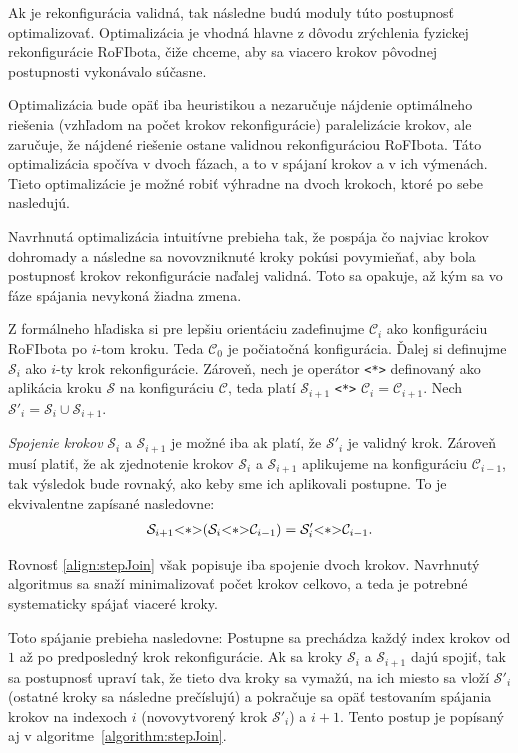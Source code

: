 \documentclass[
  printed, %
  oneside, %
  notable,   %
  nolof,     %
  nolot,     %
]{fithesis3}
\begin{document}
Ak je rekonfigurácia validná, tak následne budú moduly túto postupnosť optimalizovať. Optimalizácia je vhodná hlavne z dôvodu zrýchlenia fyzickej rekonfigurácie RoFIbota, čiže chceme, aby sa viacero krokov pôvodnej postupnosti vykonávalo súčasne. 

Optimalizácia bude opäť iba heuristikou a nezaručuje nájdenie optimálneho riešenia (vzhľadom na počet krokov rekonfigurácie) paralelizácie krokov, ale zaručuje, že nájdené riešenie ostane validnou rekonfiguráciou RoFIbota. Táto optimalizácia spočíva v dvoch fázach, a to v spájaní krokov a v ich výmenách. Tieto optimalizácie je možné robiť výhradne na dvoch krokoch, ktoré po sebe nasledujú. 

Navrhnutá optimalizácia intuitívne prebieha tak, že pospája čo najviac krokov dohromady a následne sa novovzniknuté kroky pokúsi povymieňať, aby bola postupnosť krokov rekonfigurácie naďalej validná. Toto sa opakuje, až kým sa vo fáze spájania nevykoná žiadna zmena. 

Z formálneho hľadiska si pre lepšiu orientáciu zadefinujme $\mathcal{C}_i$ ako konfiguráciu RoFIbota po $i$-tom kroku. Teda $\mathcal{C}_0$ je počiatočná konfigurácia. Ďalej si definujme $\mathcal{S}_i$ ako $i$-ty krok rekonfigurácie. Zároveň, nech je operátor \lstinline{<*>} definovaný ako aplikácia kroku $\mathcal{S}$ na konfiguráciu $\mathcal{C}$, teda platí $\mathcal{S}_{i + 1}$ \lstinline{<*>} $\mathcal{C}_i = \mathcal{C}_{i + 1}$. Nech $\mathcal{S}'_i = \mathcal{S}_i \cup \mathcal{S}_{i + 1}$. 

\textit{Spojenie krokov} $\mathcal{S}_i$ a $\mathcal{S}_{i + 1}$ je možné iba ak platí, že $\mathcal{S}'_i$ je validný krok. Zároveň musí platiť, že ak zjednotenie krokov $\mathcal{S}_i$ a $\mathcal{S}_{i + 1}$ aplikujeme na konfiguráciu $\mathcal{C}_{i - 1}$, tak výsledok bude rovnaký, ako keby sme ich aplikovali postupne. To je ekvivalentne zapísané nasledovne: 
\begin{align}
\label{align:stepJoin}
\mathcal{S}_{i + 1} \lstinline{<*>} (\mathcal{S}_i \lstinline{<*>} \mathcal{C}_{i - 1}) = \mathcal{S}'_i \lstinline{<*>} \mathcal{C}_{i - 1}. 
\end{align}

Rovnosť \ref{align:stepJoin} však popisuje iba spojenie dvoch krokov. Navrhnutý algoritmus sa snaží minimalizovať počet krokov celkovo, a teda je potrebné systematicky spájať viaceré kroky. 

Toto spájanie prebieha nasledovne: Postupne sa prechádza každý index krokov od $1$ až po predposledný krok rekonfigurácie. Ak sa kroky $\mathcal{S}_i$ a $\mathcal{S}_{i + 1}$ dajú spojiť, tak sa postupnosť upraví tak, že tieto dva kroky sa vymažú, na ich miesto sa vloží $\mathcal{S}'_i$ (ostatné kroky sa následne prečíslujú) a pokračuje sa opäť testovaním spájania krokov na indexoch $i$ (novovytvorený krok $\mathcal{S}'_i$) a $i + 1$. Tento postup je popísaný aj v algoritme~\ref{algorithm:stepJoin}. 
\end{document}
